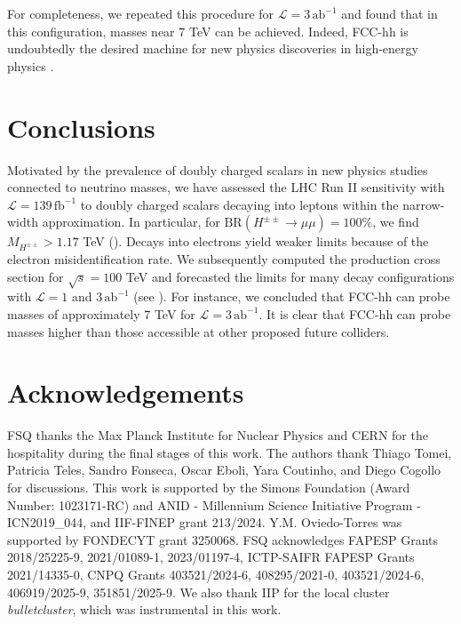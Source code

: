 \documentclass[aps, prev, twocolumn, preprintnumbers, floatfix, nofootinbib]{revtex4-1}
\begin{document}
For completeness, we repeated this procedure for $\mathcal{L}=3\,\text{ab}^{-1}$ and found that in this configuration, masses near 7 TeV can be achieved. Indeed, FCC-hh is undoubtedly the desired machine for new physics discoveries in high-energy physics \cite{Cavaliere:2025ujf}.

\section{Conclusions \label{SecV_Con}}
Motivated by the prevalence of doubly charged scalars in new physics studies connected to neutrino masses, we have assessed the LHC Run II sensitivity with $\mathcal{L}=139\,\text{fb}^{-1}$ to doubly charged scalars decaying into leptons within the narrow-width approximation. In particular, for $\text{BR}(H^{\pm\pm}\rightarrow \mu\mu)=100\%$, we find $M_{H^{\pm\pm}}> 1.17$ TeV (). Decays into electrons yield weaker limits because of the electron misidentification rate. We subsequently computed the production cross section for $\sqrt{s}=100$ TeV and forecasted the limits for many decay configurations with $\mathcal{L}=1$ and $3\,\text{ab}^{-1}$ (see ). For instance, we concluded that FCC-hh can probe masses of approximately 7 TeV for $\mathcal{L}=3\,\text{ab}^{-1}$. It is clear that FCC-hh can probe masses higher than those accessible at other proposed future colliders.

\section*{Acknowledgements}
FSQ thanks the Max Planck Institute for Nuclear Physics and CERN for the hospitality during the final stages of this work. The authors thank Thiago Tomei, Patricia Teles, Sandro Fonseca, Oscar Eboli, Yara Coutinho, and Diego Cogollo for discussions. This work is supported by the Simons Foundation (Award Number: 1023171-RC) and ANID - Millennium Science Initiative Program - ICN2019\_044, and IIF-FINEP grant 213/2024. Y.M. Oviedo-Torres was supported by FONDECYT grant 3250068. FSQ acknowledges FAPESP Grants 2018/25225-9, 2021/01089-1, 2023/01197-4, ICTP-SAIFR FAPESP Grants 2021/14335-0, CNPQ Grants 403521/2024-6, 408295/2021-0, 403521/2024-6, 406919/2025-9, 351851/2025-9. We also thank IIP for the local cluster {\it bulletcluster}, which was instrumental in this work.

\def\bibsection{\section*{References}}
%


\end{document}
